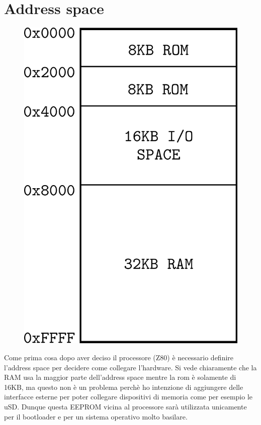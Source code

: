 \documentclass[final, ms, a4paper, 11pt]{memoir}
\newcommand\ddate{01.01.1970}
\begin{document}
\renewcommand\ddate{13.02.2017}
\section{Address space}
\begin{figure} \centering
    \includegraphics[width=.9\linewidth]{res/addrspace.pdf}
\end{figure}
Come prima cosa dopo aver deciso il processore (Z80) \`e necessario definire
l'address space per decidere come collegare l'hardware. Si vede chiaramente che
la RAM usa la maggior parte dell'address space mentre la rom \`e solamente di
16KB, ma questo non \`e un problema perch\`e ho intenzione di aggiungere delle
interfacce esterne per poter collegare dispositivi di memoria come per esempio
le uSD. Dunque questa EEPROM vicina al processore sar\`a utilizzata unicamente
per il bootloader e per un sistema operativo molto basilare.

\renewcommand\ddate{23.02.2017}
\end{document}

